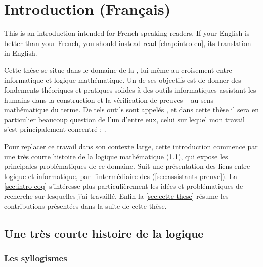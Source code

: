 \chapter{Introduction (Français)}
\label{chap:intro-fr}

\margintoc

\begin{kaobox}[backgroundcolor=Black!10!White,frametitlebackgroundcolor=Black!10!White]
  This  is an introduction intended for French-speaking readers.
  If your English is better than your French,
  you should instead read \cref{chap:intro-en}, its translation in English.
\end{kaobox}

Cette thèse se situe dans le domaine de la , lui-même au croisement entre informatique et logique mathématique.
Un de ses objectifs est de donner des fondements théoriques et pratiques solides
à des outils informatiques assistant les humains dans la construction
et la vérification de preuves – au sens mathématique du terme.
De tels outils sont appelés , et dans cette thèse il sera
en particulier beaucoup question de l’un d’entre eux, celui
sur lequel mon travail s’est principalement concentré : .

Pour replacer ce travail dans son contexte large, cette introduction
commence par une très courte histoire de la logique mathématique
(\cref{sec:logique-histoire}), qui expose les principales problématiques de ce domaine.
Suit une présentation des liens entre logique et informatique, par
l’intermédiaire des  (\cref{sec:assistants-preuve}).
La \cref{sec:intro-coq} s’intéresse plus particulièrement les idées et problématiques
de recherche sur lesquelles j’ai travaillé.
Enfin la \cref{sec:cette-these} résume les contributions présentées dans la suite de cette
thèse.

\section{Une très courte histoire de la logique}
\label{sec:logique-histoire}

\subsection{Les syllogismes}

